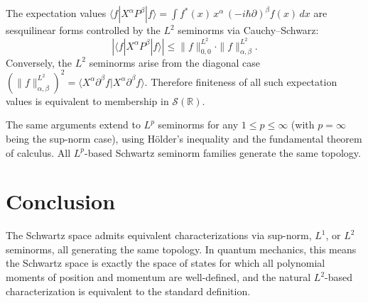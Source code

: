 \documentclass{techbrief}
\begin{document}
	\begin{remark}
		The expectation values $\langle f | X^\alpha P^\beta | f \rangle = \int f^*(x)\, x^\alpha\, (-i\hbar\partial)^\beta f(x)\, dx$ are sesquilinear forms controlled by the $L^2$ seminorms via Cauchy--Schwarz:
		\begin{equation}
			\left| \langle f | X^\alpha P^\beta | f \rangle \right| \leq \|f\|_{0,0}^{L^2} \cdot \|f\|_{\alpha,\beta}^{L^2}.
		\end{equation}
		Conversely, the $L^2$ seminorms arise from the diagonal case $\left(\|f\|_{\alpha,\beta}^{L^2}\right)^2 = \langle X^\alpha \partial^\beta f | X^\alpha \partial^\beta f \rangle$. Therefore finiteness of all such expectation values is equivalent to membership in $\mathcal{S}(\mathbb{R})$.
	\end{remark}
	
	\begin{remark}[General $L^p$]
		The same arguments extend to $L^p$ seminorms for any $1 \leq p \leq \infty$ (with $p = \infty$ being the sup-norm case), using H\"older's inequality and the fundamental theorem of calculus. All $L^p$-based Schwartz seminorm families generate the same topology.
	\end{remark}
	
	\section{Conclusion}
	
	The Schwartz space admits equivalent characterizations via sup-norm, $L^1$, or $L^2$ seminorms, all generating the same topology. In quantum mechanics, this means the Schwartz space is exactly the space of states for which all polynomial moments of position and momentum are well-defined, and the natural $L^2$-based characterization is equivalent to the standard definition.
	
\end{document}
